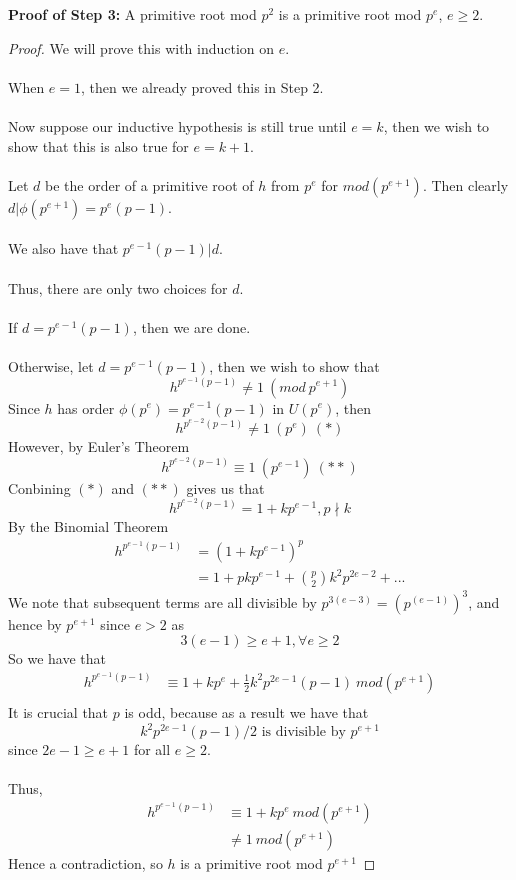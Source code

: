 {\bf Proof of Step 3:}
A primitive root mod $p^2$ is a primitive root mod $p^e$, $e \geq 2$.
\begin{proof}
We will prove this with induction on $e$.\\\\
When $e = 1$, then we already proved this in Step 2.\\\\
Now suppose our inductive hypothesis is still true until $e = k$, then we wish to show that this is also true for $e = k + 1$.\\\\
Let $d$ be the order of a primitive root of $h$ from $p^e$ for $mod(p^{e+1})$. Then clearly $d | \phi(p^{e+1}) = p^e(p-1)$.\\\\
We also have that $p^{e-1}(p - 1) | d$.\\\\
Thus, there are only two choices for $d$.\\\\
If $d = p^{e-1}(p - 1)$, then we are done.\\\\
Otherwise, let $d = p^{e-1}(p - 1)$, then we wish to show that
\[h^{p^{e-1}(p-1)} \neq 1\ (mod\ p^{e+1})\]
Since $h$ has order $\phi(p^e) = p^{e-1}(p - 1)$ in $U(p^e)$, then
\[h^{p^{e-2}(p - 1)} \neq 1\ (p^e)\ (*)\]
However, by Euler's Theorem
\[h^{p^{e - 2}(p-1)} \equiv 1\ (p^{e-1})\ (**)\]
Conbining $(*)$ and $(**)$ gives us that
\[h^{p^{e-2}(p-1)} = 1 + kp^{e-1}, p \nmid k\]
By the Binomial Theorem
\begin{align*}
    h^{p^{e-1}(p-1)} &= (1 + kp^{e-1})^p\\
    &=  1 + pkp^{e-1} + {p \choose 2}k^2p^{2e-2} + ...
\end{align*}
We note that subsequent terms are all divisible by $p^{3(e-3)} = (p^(e-1))^3$, and hence by $p^{e+1}$ since $e > 2$ as
\[3(e - 1) \geq e + 1, \forall e \geq 2\]
So we have that
\begin{align*}
    h^{p^{e-1}(p-1)} &\equiv 1 + kp^e + \frac{1}{2}k^2p^{2e-1}(p-1)\ mod(p^{e+1})\\
\end{align*}
It is crucial that $p$ is odd, because as a result we have that
\[k^2p^{2e - 1}(p - 1)/2 \text{ is divisible by } p^{e+1}\]
since $2e - 1 \geq e + 1$ for all $e \geq 2$.\\\\
Thus,
\begin{align*}
    h^{p^{e-1}(p-1)} &\equiv 1 + kp^e\ mod(p^{e+1})\\
    &\neq 1\ mod(p^{e+1})
\end{align*}
Hence a contradiction, so $h$ is a primitive root mod $p^{e+1}$
\end{proof}

